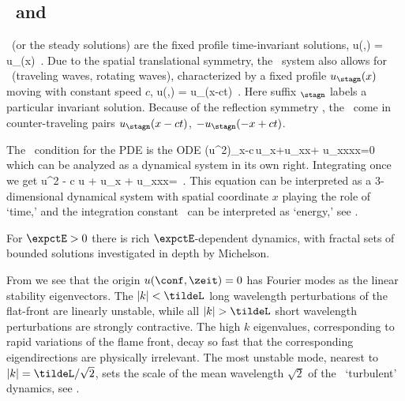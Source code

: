 

\subsection{\Eqva\ and \reqva}
\label{sec:stks}

\Eqva\  (or the steady solutions)
are the fixed profile time-invariant solutions,
\beq
 u(\conf,\zeit) = u_\stagn(x)
\,.
Due to the spatial translational symmetry,
the \KS\ system also allows for
\reqva\ (traveling waves, rotating waves),
characterized by a fixed profile $u_\stagn(x)$
moving with constant speed $c$, {\ie}
\beq
 u(\conf,\zeit) =  u_\stagn(x-ct)
\,.
Here suffix ${}_\stagn$ labels a particular invariant solution.
Because of the reflection symmetry ,
the \reqva\ come in counter-traveling pairs
$u_\stagn(x-ct)$, $-u_\stagn(-x+ct)$.

The \reqv\ condition for the {\KS} PDE  is the ODE
\beq
{\textstyle{}}(u^2)_x-c\,u_x+u_{xx}+ u_{xxxx}=0
which can be analyzed as a dynamical system in its own right.
Integrating once we get
\beq
{\textstyle{}}u^2 - c u + u_x + u_{xxx}=\expctE
\,.
\label{eq:stdks}
\eeq
This equation can be interpreted as a 3-dimen\-si\-on\-al dynamical system
with spatial coordinate $x$ playing the role of `time,'
and the integration constant \expctE\ can be interpreted as `energy,'
see .

For $\expctE>0$ there is rich $\expctE$-dependent dynamics,
with fractal sets of bounded solutions investigated in depth
by Michelson.

From  we see that the origin $u(\conf,\zeit) = 0$
has Fourier modes as the linear stability eigenvectors.  The $|k|<\tildeL$
long wavelength perturbations of the flat-front {\eqv}
are linearly unstable, while all
$|k|> \tildeL$ short wavelength perturbations are strongly contractive.
The high $k$ eigenvalues, corresponding to rapid variations of
the flame front, decay so fast that the corresponding eigendirections
are physically irrelevant.
The most unstable mode, nearest to $|k|=\tildeL/\sqrt{2}$,
sets the scale of the mean wavelength $\sqrt{2}$
of the \KS\ `turbulent' dynamics,
see .

